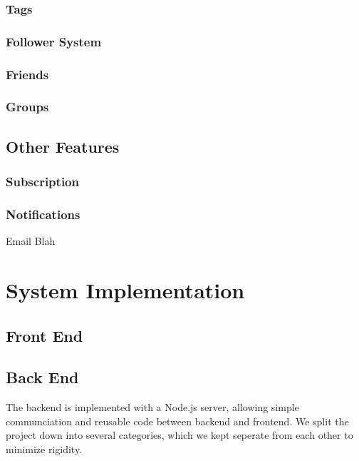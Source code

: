 \documentclass[11pt]{article}
\begin{document}
{\subsubsection {Tags}
\subsubsection {Follower System}
\subsubsection {Friends}
\subsubsection {Groups}
\subsection {Other Features}
\subsubsection {Subscription}
\subsubsection {Notifications}

Email Blah

\section {System Implementation}
\subsection {Front End}
\subsection {Back End}

The backend is implemented with a Node.js server, allowing simple communciation and reusable code between backend and frontend. We split the project down into several categories, which we kept seperate from each other to minimize rigidity.

}
\end{document}
